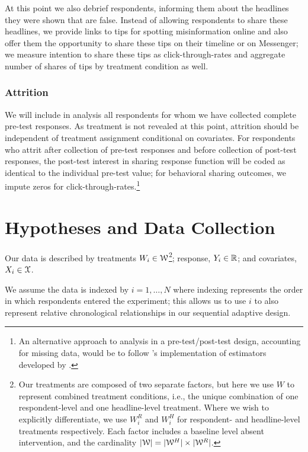 \documentclass[letterpaper, 12pt, parskip=full,DIV=10]{scrartcl}
\begin{document}
At this point we also debrief respondents, informing them about the headlines they were shown that are false. Instead of allowing respondents to share these headlines, we provide links to tips for spotting misinformation online and also offer them the opportunity to share these tips on their timeline or on Messenger; we measure intention to share these tips as click-through-rates and aggregate number of shares of tips by treatment condition as well. 


\subsubsection{Attrition} We will include in analysis all respondents for whom we have collected complete pre-test responses. As treatment is not revealed at this point, attrition should be independent of treatment assignment conditional on covariates. For respondents who attrit after collection of pre-test responses and before collection of post-test responses, the post-test interest in sharing response function will be coded as identical to the individual pre-test value; for behavioral sharing outcomes, we impute zeros for click-through-rates.\footnote{An alternative approach to analysis in a pre-test/post-test design, accounting for missing data, would be to follow \cite{davidian2005semiparametric}'s implementation of estimators developed by \cite{robins1994estimation}.}


\section{Hypotheses and Data Collection}



Our data is described by treatments $W_i \in {\EuScript W}$\footnote{Our treatments are composed of two separate factors, but here we use $W$ to represent combined treatment conditions, i.e., the unique combination of one respondent-level and one headline-level treatment. Where we wish to explicitly differentiate, we use $W^R_i$ and $W^H_i$ for respondent- and headline-level treatments respectively. Each factor includes a baseline level absent intervention, and the cardinality $|{\EuScript W}| = |{\EuScript W}^H|\times |{\EuScript W}^R|$.}; response,  $Y_i \in {\mathbb R}$; and covariates, $X_i \in {\EuScript X}$. 

We assume the data is indexed by $i = 1, \dots, N$ where indexing represents the order in which respondents entered the experiment; this allows us to use $i$ to also represent relative chronological relationships in our sequential adaptive design. 
\end{document}
